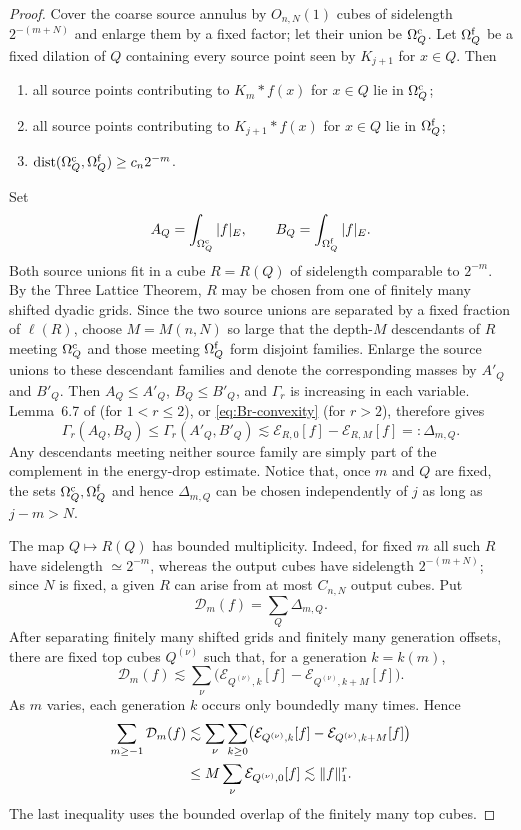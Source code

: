 \documentclass[11pt]{amsart}
\numberwithin{equation}{section}
\theoremstyle{definition}
\theoremstyle{remark}
\newcommand{\dist}{\operatorname{dist}}
\newcommand{\norm}[1]{\lVert #1\rVert}
\begin{document}
\begin{proof}
Cover the coarse source annulus by $O_{n,N}(1)$ cubes of sidelength
$2^{-(m+N)}$ and enlarge them by a fixed factor; let their union be
$\Omega_Q^{\rm c}$.  Let $\Omega_Q^{\rm f}$ be a fixed dilation of $Q$
containing every source point seen by $K_{j+1}$ for $x\in Q$.  Then
\begin{enumerate}[label=\textup{(\roman*)},leftmargin=2.4em]
\item all source points contributing to $K_m*f(x)$ for $x\in Q$ lie in
      $\Omega_Q^{\rm c}$;
\item all source points contributing to $K_{j+1}*f(x)$ for $x\in Q$ lie in
      $\Omega_Q^{\rm f}$;
\item $\dist(\Omega_Q^{\rm c},\Omega_Q^{\rm f})\ge c_n2^{-m}$.
\end{enumerate}
Set
\[
 A_Q=\int_{\Omega_Q^{\rm c}}|f|_E,
 \qquad B_Q=\int_{\Omega_Q^{\rm f}}|f|_E.
\]
Both source unions fit in a cube $R=R(Q)$ of sidelength comparable to
$2^{-m}$.  By the Three Lattice Theorem, $R$ may be chosen from one of
finitely many shifted dyadic grids.  Since the two source unions are separated by a fixed fraction of
$\ell(R)$, choose $M=M(n,N)$ so large that the depth-$M$ descendants of $R$
meeting $\Omega_Q^{\rm c}$ and those meeting $\Omega_Q^{\rm f}$ form disjoint
families.  Enlarge the source unions to these descendant families and denote
the corresponding masses by $A'_Q$ and $B'_Q$.  Then
$A_Q\le A'_Q$, $B_Q\le B'_Q$, and $\Gamma_r$ is increasing in each variable.
Lemma~6.7 of \cite{Stolyarov24} (for $1<r\le2$), or
\eqref{eq:Br-convexity} (for $r>2$), therefore gives
\begin{equation}\label{eq:AB-energy}
 \Gamma_r(A_Q,B_Q)
 \le \Gamma_r(A'_Q,B'_Q)
 \lesssim \mathcal E_{R,0}[f]-\mathcal E_{R,M}[f]
 =:\Delta_{m,Q}.
\end{equation}
Any descendants meeting neither source family are simply part of the
complement in the energy-drop estimate.  Notice that, once $m$ and $Q$ are
fixed, the sets $\Omega_Q^{\rm c},\Omega_Q^{\rm f}$ and hence
$\Delta_{m,Q}$ can be chosen independently of $j$ as long as $j-m>N$.

The map $Q\mapsto R(Q)$ has bounded multiplicity.  Indeed, for fixed $m$ all
such $R$ have sidelength $\simeq2^{-m}$, whereas the output cubes have
sidelength $2^{-(m+N)}$; since $N$ is fixed, a given $R$ can arise from at
most $C_{n,N}$ output cubes.  Put
\[
 \mathcal D_m(f)=\sum_Q\Delta_{m,Q}.
\]
After separating finitely many shifted grids and finitely many generation
offsets, there are fixed top cubes $Q^{(\nu)}$ such that, for a generation
$k=k(m)$,
\[
 \mathcal D_m(f)
 \lesssim \sum_\nu
 \bigl(\mathcal E_{Q^{(\nu)},k}[f]
       -\mathcal E_{Q^{(\nu)},k+M}[f]\bigr).
\]
As $m$ varies, each generation $k$ occurs only boundedly many times.  Hence
\begin{align}
 \sum_{m\ge-1}\mathcal D_m(f)
 &\lesssim \sum_\nu\sum_{k\ge0}
 \bigl(\mathcal E_{Q^{(\nu)},k}[f]
       -\mathcal E_{Q^{(\nu)},k+M}[f]\bigr)\notag\\
 &\le M\sum_\nu \mathcal E_{Q^{(\nu)},0}[f]
 \lesssim \norm f_1^r.                                      \label{eq:Dm-positive}
\end{align}
The last inequality uses the bounded overlap of the finitely many top cubes.


\end{proof}
\end{document}
